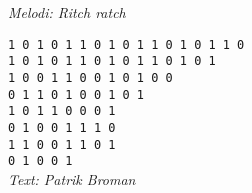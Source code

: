 {\footnotesize\textit{Melodi: Ritch ratch}}\par
\vspace{10pt}
\texttt{1 0 1 0 1 1 0 1 0 1 1 0 1 0 1 1 0} \\
\texttt{1 0 1 0 1 1 0 1 0 1 1 0 1 0 1} \\
\texttt{1 0 0 1 1 0 0 1 0 1 0 0} \\
\texttt{0 1 1 0 1 0 0 1 0 1} \\
\texttt{1 0 1 1 0 0 0 1} \\
\texttt{0 1 0 0 1 1 1 0} \\
\texttt{1 1 0 0 1 1 0 1} \\
\texttt{0 1 0 0 1} \\
\vspace{10pt}
{\footnotesize\textit{Text: Patrik Broman}}
